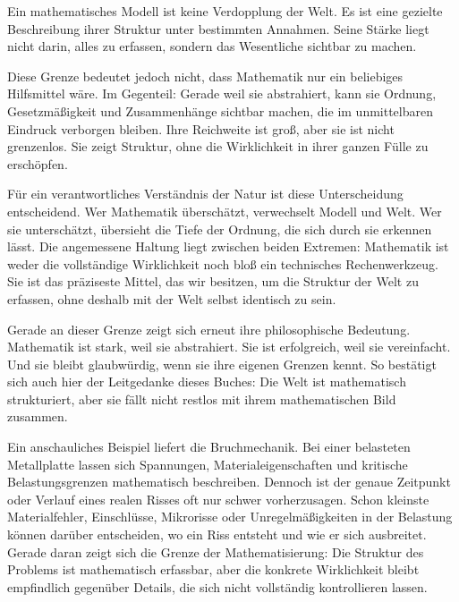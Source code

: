 \begin{DidacticBox}
	\label{box:modell-wirklichkeit}
	Ein mathematisches Modell ist keine Verdopplung der Welt.
	Es ist eine gezielte Beschreibung ihrer Struktur unter bestimmten Annahmen.
	Seine Stärke liegt nicht darin,
	alles zu erfassen,
	sondern das Wesentliche sichtbar zu machen.
\end{DidacticBox}

Diese Grenze bedeutet jedoch nicht,
dass Mathematik nur ein beliebiges Hilfsmittel wäre.
Im Gegenteil:
Gerade weil sie abstrahiert,
kann sie Ordnung,
Gesetzmäßigkeit
und Zusammenhänge sichtbar machen,
die im unmittelbaren Eindruck verborgen bleiben.
Ihre Reichweite ist groß,
aber sie ist nicht grenzenlos.
Sie zeigt Struktur,
ohne die Wirklichkeit in ihrer ganzen Fülle zu erschöpfen.

Für ein verantwortliches Verständnis der Natur ist diese Unterscheidung entscheidend.
Wer Mathematik überschätzt,
verwechselt Modell und Welt.
Wer sie unterschätzt,
übersieht die Tiefe der Ordnung,
die sich durch sie erkennen lässt.
Die angemessene Haltung liegt zwischen beiden Extremen:
Mathematik ist weder die vollständige Wirklichkeit
noch bloß ein technisches Rechenwerkzeug.
Sie ist das präziseste Mittel,
das wir besitzen,
um die Struktur der Welt zu erfassen,
ohne deshalb mit der Welt selbst identisch zu sein.

Gerade an dieser Grenze zeigt sich erneut ihre philosophische Bedeutung.
Mathematik ist stark,
weil sie abstrahiert.
Sie ist erfolgreich,
weil sie vereinfacht.
Und sie bleibt glaubwürdig,
wenn sie ihre eigenen Grenzen kennt.
So bestätigt sich auch hier der Leitgedanke dieses Buches:
Die Welt ist mathematisch strukturiert,
aber sie fällt nicht restlos mit ihrem mathematischen Bild zusammen.

Ein anschauliches Beispiel liefert die Bruchmechanik.
Bei einer belasteten Metallplatte lassen sich Spannungen,
Materialeigenschaften
und kritische Belastungsgrenzen mathematisch beschreiben.
Dennoch ist der genaue Zeitpunkt oder Verlauf eines realen Risses oft nur schwer vorherzusagen.
Schon kleinste Materialfehler,
Einschlüsse,
Mikrorisse
oder Unregelmäßigkeiten in der Belastung können darüber entscheiden,
wo ein Riss entsteht
und wie er sich ausbreitet.
Gerade daran zeigt sich die Grenze der Mathematisierung:
Die Struktur des Problems ist mathematisch erfassbar,
aber die konkrete Wirklichkeit bleibt empfindlich gegenüber Details,
die sich nicht vollständig kontrollieren lassen.


